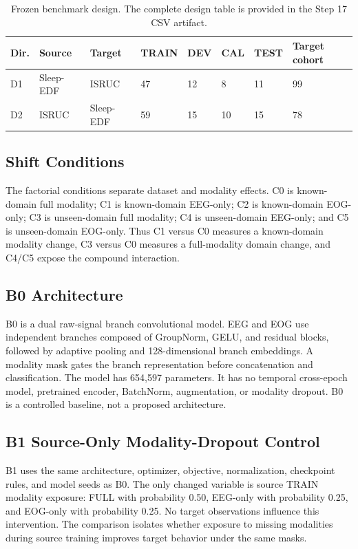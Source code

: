 \documentclass[10pt,twocolumn]{article}
\begin{document}
\begin{table}[t]
\centering\small
\caption{Frozen benchmark design. The complete design table is provided in the Step 17 CSV artifact.}
\label{tab:design}
\begin{tabular}{llllllll}
\toprule
Dir. & Source & Target & TRAIN & DEV & CAL & TEST & Target cohort\\
\midrule
D1 & Sleep-EDF & ISRUC & 47 & 12 & 8 & 11 & 99\\
D2 & ISRUC & Sleep-EDF & 59 & 15 & 10 & 15 & 78\\
\bottomrule
\end{tabular}
\end{table}

\subsection{Shift Conditions}
The factorial conditions separate dataset and modality effects. C0 is known-domain full modality; C1 is known-domain EEG-only; C2 is known-domain EOG-only; C3 is unseen-domain full modality; C4 is unseen-domain EEG-only; and C5 is unseen-domain EOG-only. Thus C1 versus C0 measures a known-domain modality change, C3 versus C0 measures a full-modality domain change, and C4/C5 expose the compound interaction.

\subsection{B0 Architecture}
B0 is a dual raw-signal branch convolutional model. EEG and EOG use independent branches composed of GroupNorm, GELU, and residual blocks, followed by adaptive pooling and 128-dimensional branch embeddings. A modality mask gates the branch representation before concatenation and classification. The model has 654,597 parameters. It has no temporal cross-epoch model, pretrained encoder, BatchNorm, augmentation, or modality dropout. B0 is a controlled baseline, not a proposed architecture.

\subsection{B1 Source-Only Modality-Dropout Control}
B1 uses the same architecture, optimizer, objective, normalization, checkpoint rules, and model seeds as B0. The only changed variable is source TRAIN modality exposure: FULL with probability 0.50, EEG-only with probability 0.25, and EOG-only with probability 0.25. No target observations influence this intervention. The comparison isolates whether exposure to missing modalities during source training improves target behavior under the same masks.
\end{document}
